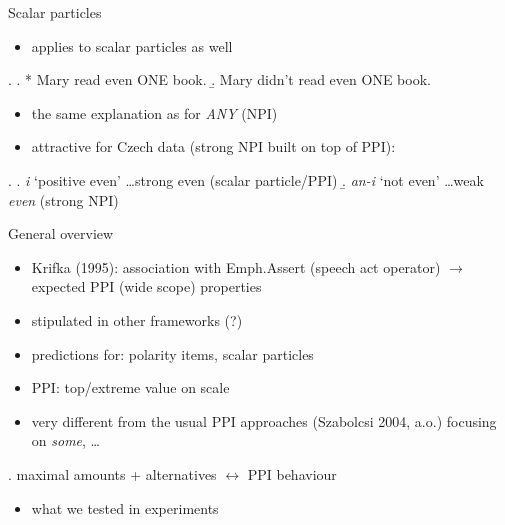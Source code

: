 \documentclass[ignorenonframetext,]{beamer}
\providecommand{\tightlist}{%
  \setlength{\itemsep}{0pt}\setlength{\parskip}{0pt}}
\begin{document}
\begin{frame}{Scalar particles}

\begin{itemize}
\tightlist
\item
  applies to scalar particles as well
\end{itemize}

\ex. \a. * Mary read even ONE book. \b. Mary didn't read even ONE book.

\begin{itemize}
\tightlist
\item
  the same explanation as for \emph{ANY} (NPI)
\item
  attractive for Czech data (strong NPI built on top of PPI):
\end{itemize}

\ex. \a. \emph{i} `positive even' \ldots strong even (scalar
particle/PPI) \b. \emph{an-i} `not even' \ldots weak \emph{even} (strong
NPI)

\end{frame}

\begin{frame}{General overview}

\begin{itemize}
\tightlist
\item
  Krifka (1995): association with Emph.Assert (speech act operator)
  \(\rightarrow\) expected PPI (wide scope) properties
\item
  stipulated in other frameworks (?)
\item
  predictions for: polarity items, scalar particles
\item
  PPI: top/extreme value on scale
\item
  very different from the usual PPI approaches (Szabolcsi 2004, a.o.)
  focusing on \emph{some}, \ldots{}
\end{itemize}

\ex. maximal amounts + alternatives \(\leftrightarrow\) PPI behaviour

\begin{itemize}
\tightlist
\item
  what we tested in experiments
\end{itemize}

\end{frame}
\end{document}
